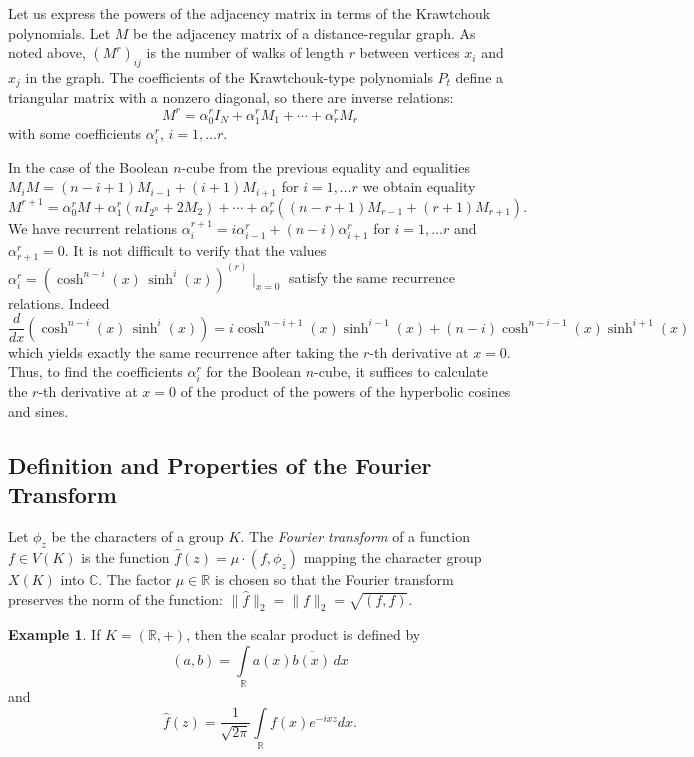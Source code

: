 \documentclass[11pt]{article}
\theoremstyle{definition}
\newtheorem{example}{Example}[section]
\begin{document}
{{{Let us express the powers of the adjacency matrix in terms of the Krawtchouk polynomials. Let $M$ be the adjacency matrix of a distance-regular graph. As noted above, $(M^r)_{ij}$
is the number of walks of length $r$ between vertices $x_i$ and $x_j$ in the graph. The coefficients of the Krawtchouk-type   polynomials $P_t$ define a
triangular matrix with a nonzero diagonal, so there are inverse
relations:
$$M^r = \alpha^r_0 I_{N} + \alpha^r_1 M_1+ \cdots+ \alpha^r_r M_r$$
with some coefficients $\alpha^r_i$, $i=1,\dots r$.

In the case of the Boolean $n$-cube from the previous equality and equalities
$M_iM=(n-i+1)M_{i-1}+(i+1)M_{i+1}$ for $i=1,\dots r$ we obtain
equality
$$M^{r+1} = \alpha^r_0 M + \alpha^r_1 (nI_{2^n}+2M_2)+ \cdots+
\alpha^r_r((n-r+1)M_{r-1}+(r+1)M_{r+1}).$$ 
We have recurrent
relations $\alpha^{r+1}_i=i\alpha^r_{i-1}+(n-i)\alpha^r_{i+1}$ for
$i=1,\dots r$ and $\alpha^r_{r+1}=0$. It is not difficult to verify that the values $\alpha^r_i
= ({\cosh}^{n-i}(x)\,{\sinh}^{i}(x))^{(r)} \mid_{x=0}$ satisfy the same recurrence relations. 
Indeed $$\frac{d}{dx} ({\cosh}^{n-i}(x)\,{\sinh}^{i}(x))=i\cosh^{n-i+1}(x)\sinh^{i-1}(x)+(n-i)\cosh^{n-i-1}(x)\sinh^{i+1}(x)$$
which yields exactly the same recurrence after taking the $r$-th derivative at $x=0$.
 Thus, to find the coefficients $\alpha^r_i$ for the Boolean $n$-cube, it suffices to calculate the $r$-th derivative at $x=0$ of the product
of the powers of the hyperbolic cosines and sines.






\subsection{Definition and Properties of the Fourier Transform}\label{10.4}

Let $\phi_z$ be the characters of a group $K$. The {\sl Fourier transform} of a function $f\in V({K})$ is the function
$\widehat{f}(z)=\mu\cdot(f,\phi_z)$ mapping the character group $X(K)$ into $\mathbb{C}$. The factor $\mu\in \mathbb{R}$ is chosen so that the Fourier transform preserves the norm of the function:
$\|\widehat{f}\|_2=\|f\|_2=\sqrt{(f,f)}$.

\begin{example}
If $K=(\mathbb{R},+)$, then the scalar product is defined by
\[(a,b)=\int\limits_{\mathbb{R}}a(x)\overline{b(x)}\,dx\]
and
\[\widehat{f}(z)=\frac{1}{\sqrt{2\pi}}\int\limits_{\mathbb{R}}f(x)e^{-ixz}dx.\]
\end{example}

}}}
\end{document}
